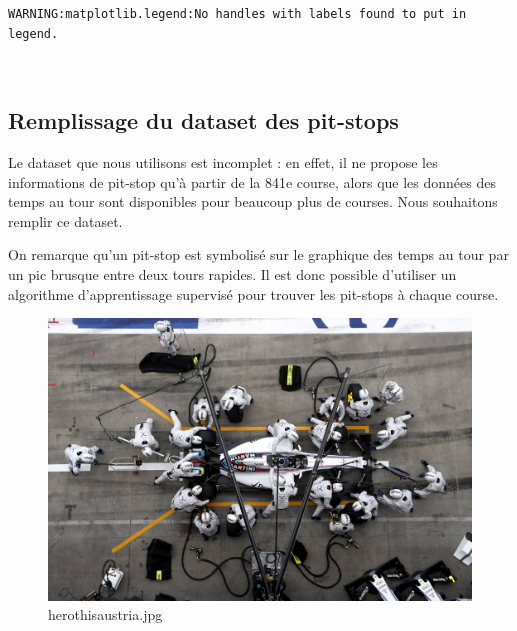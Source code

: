 \documentclass[11pt]{article}
\begin{document}
    \begin{Verbatim}[commandchars=\\\{\}]
WARNING:matplotlib.legend:No handles with labels found to put in legend.
    \end{Verbatim}

    \begin{center}
    \end{center}
    { \hspace*{\fill} \\}
    
    \hypertarget{remplissage-du-dataset-des-pit-stops}{%
\subsection{Remplissage du dataset des
pit-stops}\label{remplissage-du-dataset-des-pit-stops}}

Le dataset que nous utilisons est incomplet : en effet, il ne propose
les informations de pit-stop qu'à partir de la 841e course, alors que
les données des temps au tour sont disponibles pour beaucoup plus de
courses. Nous souhaitons remplir ce dataset.

On remarque qu'un pit-stop est symbolisé sur le graphique des temps au
tour par un pic brusque entre deux tours rapides. Il est donc possible
d'utiliser un algorithme d'apprentissage supervisé pour trouver les
pit-stops à chaque course.

\begin{figure}
\centering
\includegraphics{williams.jpg}
\caption{herothisaustria.jpg}
\end{figure}
\end{document}
